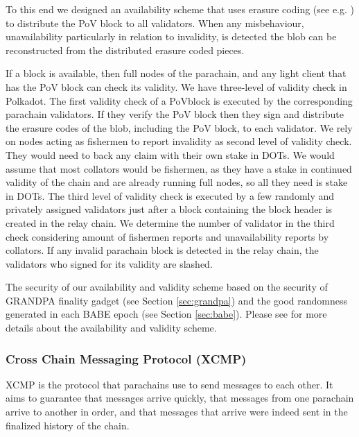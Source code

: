To this end we designed an availability scheme that uses erasure coding (see e.g. \cite{availabilityETH2}) to distribute the PoV block to all validators.
When any misbehaviour, unavailability particularly in relation to invalidity, is detected the blob can be reconstructed from the distributed erasure coded pieces.

If a block is available, then full nodes of the parachain, and any light client that has the PoV block can check its validity. We have three-level of validity check in Polkadot. The first validity check of a PoVblock is executed by the corresponding parachain validators. If they verify the PoV block then they sign and distribute the erasure codes of the blob, including the PoV block, to each validator.
We rely on nodes acting as fishermen to report invalidity as second level of validity check. They would need to back any claim with their own stake in DOTs. We would assume that most collators would be fishermen, as they have a stake in continued validity of the chain and are already running full nodes, so all they need is stake in DOTs. The third level of validity check is executed by a few randomly and privately assigned validators just after a block containing the block header is created in the relay chain. We determine the number of validator in the third check considering amount of fishermen reports and unavailability reports by collators. If  any invalid parachain block is detected in the relay chain, the validators who signed for its validity are slashed.

The security of our availability and validity scheme based on the security of GRANDPA finality gadget (see Section \ref{sec:grandpa}) and the good randomness generated in each BABE epoch (see Section \ref{sec:babe}). Please see \cite{availandvalid} for more details about the availability and validity scheme.


\subsubsection{Cross Chain Messaging Protocol (XCMP)} \label{sec:XCMP}
XCMP is the protocol that parachains use to send messages to each other. It aims to guarantee that messages arrive quickly, that messages from one parachain arrive to another in order,
and that messages that arrive were indeed sent in the finalized history of the chain.

